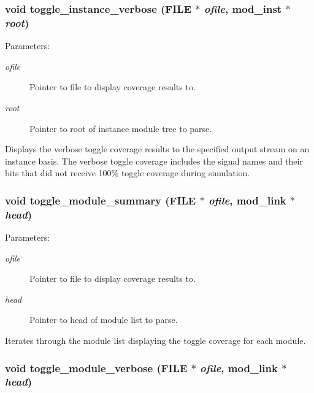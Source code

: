 \subsubsection{\setlength{\rightskip}{0pt plus 5cm}void toggle\_\-instance\_\-verbose (FILE $\ast$ {\em ofile}, {\bf mod\_\-inst} $\ast$ {\em root})}\label{toggle_8c_a6}


\begin{Desc}
\item[Parameters: ]\par
\begin{description}
\item[{\em 
ofile}]Pointer to file to display coverage results to. \item[{\em 
root}]Pointer to root of instance module tree to parse.\end{description}
\end{Desc}
Displays the verbose toggle coverage results to the specified output stream on an instance basis. The verbose toggle coverage includes the signal names and their bits that did not receive 100\% toggle coverage during simulation. 
\subsubsection{\setlength{\rightskip}{0pt plus 5cm}void toggle\_\-module\_\-summary (FILE $\ast$ {\em ofile}, {\bf mod\_\-link} $\ast$ {\em head})}\label{toggle_8c_a4}


\begin{Desc}
\item[Parameters: ]\par
\begin{description}
\item[{\em 
ofile}]Pointer to file to display coverage results to. \item[{\em 
head}]Pointer to head of module list to parse.\end{description}
\end{Desc}
Iterates through the module list displaying the toggle coverage for each module. 
\subsubsection{\setlength{\rightskip}{0pt plus 5cm}void toggle\_\-module\_\-verbose (FILE $\ast$ {\em ofile}, {\bf mod\_\-link} $\ast$ {\em head})}\label{toggle_8c_a7}


